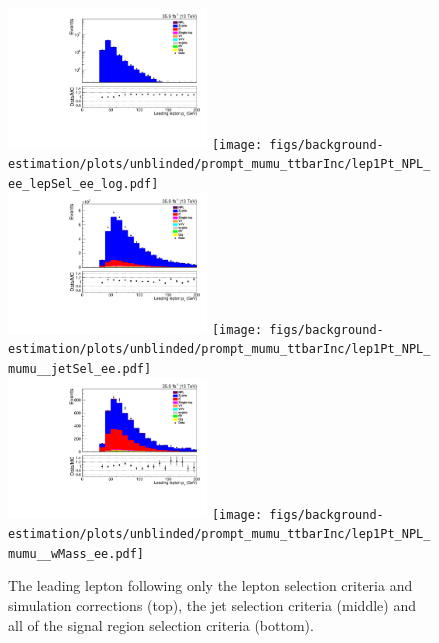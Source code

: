 \begin{figure}[h]
\centering
\includegraphics[width=0.47\textwidth]{figs/background-estimation/plots/unblinded/prompt_ee_ttbarInc/lep1Pt_NPL_ee_lepSel_ee_log.pdf}
\texttt{[image: figs/background-estimation/plots/unblinded/prompt\_mumu\_ttbarInc/lep1Pt\_NPL\_ee\_lepSel\_ee\_log.pdf]}
\\
\includegraphics[width=0.47\textwidth]{figs/background-estimation/plots/unblinded/prompt_ee_ttbarInc/lep1Pt_NPL_ee_jetSel_ee.pdf}
\texttt{[image: figs/background-estimation/plots/unblinded/prompt\_mumu\_ttbarInc/lep1Pt\_NPL\_mumu\_\_jetSel\_ee.pdf]}
\\
\includegraphics[width=0.47\textwidth]{figs/background-estimation/plots/unblinded/prompt_ee_ttbarInc/lep1Pt_NPL_ee_wMass_ee.pdf}
\texttt{[image: figs/background-estimation/plots/unblinded/prompt\_mumu\_ttbarInc/lep1Pt\_NPL\_mumu\_\_wMass\_ee.pdf]}
\caption{
The leading lepton \pT following only the lepton selection criteria and simulation corrections (top), the jet selection criteria (middle) and all of the signal region selection criteria (bottom).
}
\label{fig:SR_lep1Pt}
\end{figure}

